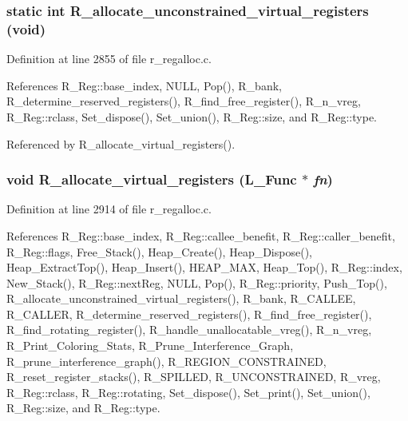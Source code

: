 \subsubsection{\setlength{\rightskip}{0pt plus 5cm}static int R\_\-allocate\_\-unconstrained\_\-virtual\_\-registers (void)\hspace{0.3cm}{\tt  [static]}}\label{r__regalloc_8c_1442643f4cf880c474b6c479e20ff07f}




Definition at line 2855 of file r\_\-regalloc.c.

References R\_\-Reg::base\_\-index, NULL, Pop(), R\_\-bank, R\_\-determine\_\-reserved\_\-registers(), R\_\-find\_\-free\_\-register(), R\_\-n\_\-vreg, R\_\-Reg::rclass, Set\_\-dispose(), Set\_\-union(), R\_\-Reg::size, and R\_\-Reg::type.

Referenced by R\_\-allocate\_\-virtual\_\-registers().
\subsubsection{\setlength{\rightskip}{0pt plus 5cm}void R\_\-allocate\_\-virtual\_\-registers (L\_\-Func $\ast$ {\em fn})}\label{r__regalloc_8c_b99ed1308f1ddc6f004858871fd65276}




Definition at line 2914 of file r\_\-regalloc.c.

References R\_\-Reg::base\_\-index, R\_\-Reg::callee\_\-benefit, R\_\-Reg::caller\_\-benefit, R\_\-Reg::flags, Free\_\-Stack(), Heap\_\-Create(), Heap\_\-Dispose(), Heap\_\-Extract\-Top(), Heap\_\-Insert(), HEAP\_\-MAX, Heap\_\-Top(), R\_\-Reg::index, New\_\-Stack(), R\_\-Reg::next\-Reg, NULL, Pop(), R\_\-Reg::priority, Push\_\-Top(), R\_\-allocate\_\-unconstrained\_\-virtual\_\-registers(), R\_\-bank, R\_\-CALLEE, R\_\-CALLER, R\_\-determine\_\-reserved\_\-registers(), R\_\-find\_\-free\_\-register(), R\_\-find\_\-rotating\_\-register(), R\_\-handle\_\-unallocatable\_\-vreg(), R\_\-n\_\-vreg, R\_\-Print\_\-Coloring\_\-Stats, R\_\-Prune\_\-Interference\_\-Graph, R\_\-prune\_\-interference\_\-graph(), R\_\-REGION\_\-CONSTRAINED, R\_\-reset\_\-register\_\-stacks(), R\_\-SPILLED, R\_\-UNCONSTRAINED, R\_\-vreg, R\_\-Reg::rclass, R\_\-Reg::rotating, Set\_\-dispose(), Set\_\-print(), Set\_\-union(), R\_\-Reg::size, and R\_\-Reg::type.

